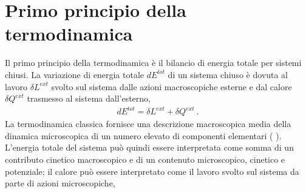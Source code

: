 \documentclass[letterpaper,10pt,italian]{jupyterBook}
\begin{document}
\sphinxstepscope


\section{Primo principio della termodinamica}
\label{\detokenize{ch/thermodynamics/principles-first:primo-principio-della-termodinamica}}\label{\detokenize{ch/thermodynamics/principles-first:physics-hs-thermodynamics-foundation-principles-first}}\label{\detokenize{ch/thermodynamics/principles-first::doc}}
\sphinxAtStartPar
Il primo principio della termodinamica è il bilancio di energia totale per sistemi chiusi. La variazione di energia totale \(d E^{tot}\) di un sistema chiuso è dovuta al lavoro \(\delta L^{ext}\) svolto sul sistema dalle azioni macroscopiche esterne e dal calore \(\delta Q^{ext}\) trasmesso al sistema dall’esterno,
\begin{equation*}
\begin{split}d E^{tot} = \delta L^{ext} + \delta Q^{ext} \ .\end{split}
\end{equation*}
\sphinxAtStartPar
La termodinamica classica fornisce una descrizione macroscopica media della dinamica microscopica di un numero elevato di componenti elementari ( ). L’energia totale del sistema può quindi essere interpretata come somma di un contributo cinetico macroscopico e di un contenuto microscopico, cinetico e potenziale; il calore può essere interpretato come il lavoro svolto sul sistema da parte di azioni microscopiche,



\sphinxstepscope
\end{document}
